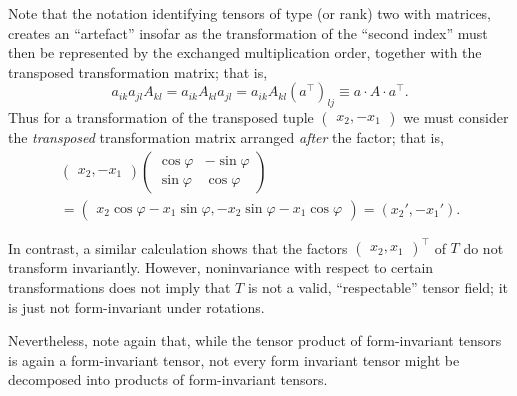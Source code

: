 {Note that  the notation identifying tensors of type (or rank) two with matrices,
creates an ``artefact'' insofar as the transformation of the ``second index'' must then be represented by
the exchanged multiplication order, together with the transposed transformation matrix;
that is,
\begin{equation}
a_{ik}a_{jl}A_{kl}
=  a_{ik}A_{kl}a_{jl}
=  a_{ik}A_{kl}\left(a^\intercal  \right)_{lj}
\equiv a\cdot A\cdot a^\intercal  .
\end{equation}
Thus for a
transformation  of
the transposed tuple  $\begin{pmatrix}   {  x}_2 ,- {  x}_1  \end{pmatrix}$
we must consider the {\em transposed} transformation matrix arranged {\em after} the factor; that is,
\begin{equation}
\begin{split}
\begin{pmatrix}  {  x}_2 , - {  x}_1 \end{pmatrix}
\begin{pmatrix}  \cos \varphi & -\sin \varphi  \\
  \sin \varphi & \cos \varphi
\end{pmatrix}
\\
=
\begin{pmatrix}
{  x}_2 \cos \varphi  - x_1 \sin \varphi ,
 - x_2 \sin \varphi         - {  x}_1 \cos \varphi
\end{pmatrix}
=
\left(
{  x}_2'  ,
 - {  x}_1'
\right).
\end{split}
\end{equation}



In contrast, a similar calculation shows that the factors
$\begin{pmatrix}  {  x}_2 ,  {  x}_1  \end{pmatrix}^\intercal $
of $T$ do not transform invariantly.
However, noninvariance with respect to certain transformations does not imply that
$T$ is not a valid, ``respectable'' tensor field; it is just not form-invariant under rotations.
\eexample
}

Nevertheless, note again that, while the tensor product of form-invariant tensors is again a form-invariant tensor,  not every form
invariant tensor might be decomposed into products of form-invariant tensors.

